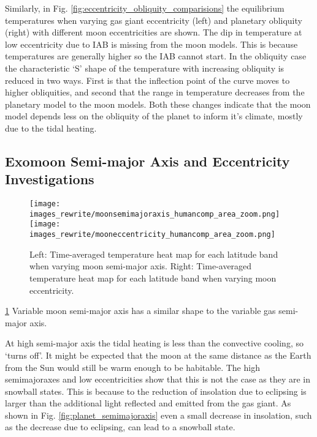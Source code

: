 \documentclass[12pt, onecolumn]{revtex4-2}    %
\begin{document}
Similarly, in Fig. \ref{fig:eccentricity_obliquity_comparisions} the equilibrium temperatures when varying gas giant eccentricity (left) and planetary obliquity (right) with different moon eccentricities are shown.
The dip in temperature at low eccentricity due to IAB is missing from the moon models.
This is because temperatures are generally higher so the IAB cannot start.
In the obliquity case the characteristic `S' shape of the temperature with increasing obliquity is reduced in two ways.
First is that the inflection point of the curve moves to higher obliquities, and second that the range in temperature decreases from the planetary model to the moon models.
Both these changes indicate that the moon model depends less on the obliquity of the planet to inform it's climate, mostly due to the tidal heating.

\subsection{Exomoon Semi-major Axis and Eccentricity Investigations} \label{ssec:Exomoon_specific_results}
%
\begin{figure}[t]
  \texttt{[image: images\_rewrite/moonsemimajoraxis\_humancomp\_area\_zoom.png]}
  \texttt{[image: images\_rewrite/mooneccentricity\_humancomp\_area\_zoom.png]}
  \caption{
    Left:  Time-averaged temperature heat map for each latitude band when varying moon semi-major axis.
    Right: Time-averaged temperature heat map for each latitude band when varying moon eccentricity.
  }
  \label{fig:moon_semimajoraxis_eccentricity}
\end{figure}

\ref{fig:moon_semimajoraxis_eccentricity}
Variable moon semi-major axis has a similar shape to the variable gas semi-major axis.

At high semi-major axis the tidal heating is less than the convective cooling, so `turns off'.
It might be expected that the moon at the same distance as the Earth from the Sun would still be warm enough to be habitable.
The high semimajoraxes and low eccentricities show that this is not the case as they are in snowball states.
This is because to the reduction of insolation due to eclipsing is larger than the additional light reflected and emitted from the gas giant.
As shown in Fig. \ref{fig:planet_semimajoraxis} even a small decrease in insolation, such as the decrease due to eclipsing, can lead to a snowball state.
\end{document}
